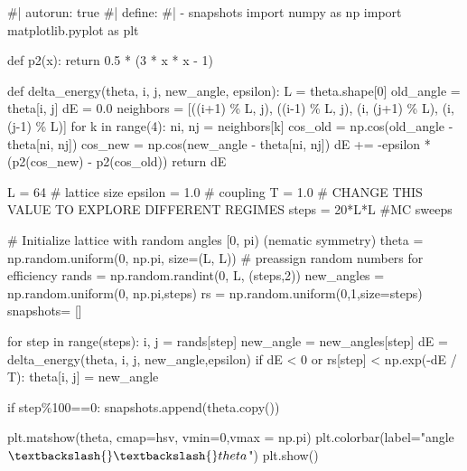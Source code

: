 \documentclass[
  letterpaper,
  enabledeprecatedfontcommands]{report}
\newenvironment{Shaded}{\begin{snugshade}}{\end{snugshade}}
\newcommand{\NormalTok}[1]{\textcolor[rgb]{0.00,0.23,0.31}{#1}}
\begin{document}
\begin{Shaded}
\begin{Highlighting}[]
\NormalTok{\#| autorun: true}
\NormalTok{\#| define:}
\NormalTok{\#|   {-} snapshots}
\NormalTok{import numpy as np}
\NormalTok{import matplotlib.pyplot as plt}

\NormalTok{def p2(x):}
\NormalTok{    return 0.5 * (3 * x * x {-} 1)}

\NormalTok{def delta\_energy(theta, i, j, new\_angle, epsilon):}
\NormalTok{    L = theta.shape[0]}
\NormalTok{    old\_angle = theta[i, j]}
\NormalTok{    dE = 0.0}
\NormalTok{    neighbors = [((i+1) \% L, j), ((i{-}1) \% L, j), (i, (j+1) \% L), (i, (j{-}1) \% L)]}
\NormalTok{    for k in range(4):}
\NormalTok{        ni, nj = neighbors[k]}
\NormalTok{        cos\_old = np.cos(old\_angle {-} theta[ni, nj])}
\NormalTok{        cos\_new = np.cos(new\_angle {-} theta[ni, nj])}
\NormalTok{        dE += {-}epsilon * (p2(cos\_new) {-} p2(cos\_old))}
\NormalTok{    return dE}

\NormalTok{L = 64  \# lattice size}
\NormalTok{epsilon = 1.0  \# coupling}
\NormalTok{T = 1.0  \# CHANGE THIS VALUE TO EXPLORE DIFFERENT REGIMES }
\NormalTok{steps = 20*L*L \#MC sweeps}

\NormalTok{\# Initialize lattice with random angles [0, pi) (nematic symmetry)}
\NormalTok{theta = np.random.uniform(0, np.pi, size=(L, L))}
\NormalTok{\# preassign random numbers for efficiency}
\NormalTok{rands = np.random.randint(0, L, (steps,2))}
\NormalTok{new\_angles = np.random.uniform(0, np.pi,steps)}
\NormalTok{rs = np.random.uniform(0,1,size=steps)}
\NormalTok{snapshots= []}

\NormalTok{for step in range(steps):}
\NormalTok{    i, j = rands[step]}
\NormalTok{    new\_angle = new\_angles[step]}
\NormalTok{    dE = delta\_energy(theta, i, j, new\_angle,epsilon)}
\NormalTok{    if dE \textless{} 0 or rs[step] \textless{} np.exp({-}dE / T):}
\NormalTok{        theta[i, j] = new\_angle}

\NormalTok{    if step\%100==0:}
\NormalTok{        snapshots.append(theta.copy())}


\NormalTok{plt.matshow(theta, cmap=\textquotesingle{}hsv\textquotesingle{}, vmin=0,vmax = np.pi)}
\NormalTok{plt.colorbar(label="angle $\textbackslash{}\textbackslash{}theta$")}
\NormalTok{plt.show()}
\end{Highlighting}
\end{Shaded}
\end{document}
